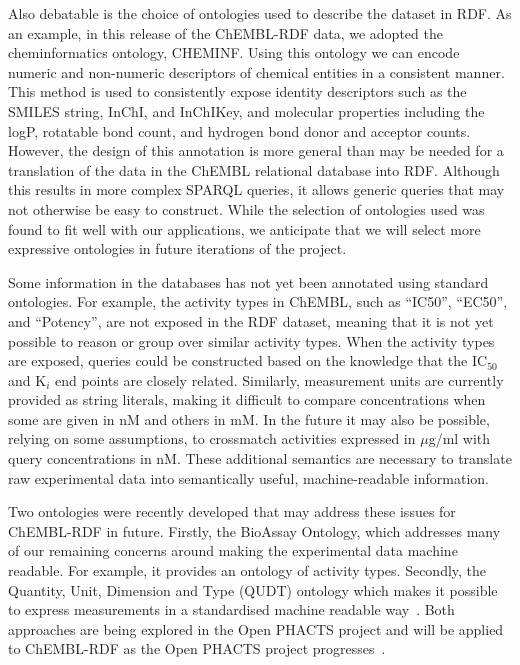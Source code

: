 \documentclass[10pt]{bmc_article}
\newenvironment{bmcformat}{\begin{raggedright}\baselineskip20pt\sloppy\setboolean{publ}{false}}{\end{raggedright}\baselineskip20pt\sloppy}
\begin{document}
\begin{bmcformat}
Also debatable is the choice of ontologies used to describe the dataset in RDF. As an example, in this release of the
ChEMBL-RDF data, we adopted the cheminformatics ontology, CHEMINF. Using this ontology
we can encode numeric and non-numeric descriptors of chemical entities in a consistent
manner. This method is used to consistently expose identity descriptors such
as the SMILES string, InChI, and InChIKey, and molecular properties including the
logP, rotatable bond count, and hydrogen bond donor and acceptor counts.
However, the design of this annotation is more general than may be needed for a translation
of the data in the ChEMBL relational database into RDF. Although this results in more 
complex SPARQL queries, it allows generic queries that may not otherwise be easy to construct.
While the selection of ontologies used was found to fit well with our applications,
we anticipate that we will select more expressive ontologies in future iterations of the project.

Some information in the databases has not yet been annotated using standard ontologies. 
For example, the activity types in ChEMBL, such as ``IC50'', ``EC50'', and ``Potency'', are not exposed in the RDF dataset,
meaning that it is not yet possible to reason or group over similar activity types.
When the activity types are exposed, queries could be constructed based on the knowledge 
that the IC$_{50}$ and K$_i$ end points are closely related. Similarly, measurement units are currently provided as
string literals, making it difficult to compare concentrations when some are given in nM and others in mM.
In the future it may also be possible, relying on some assumptions, to crossmatch activities
expressed in $\mu$g/ml with query concentrations in nM. These additional semantics are necessary 
to translate raw experimental data into semantically useful, machine-readable information.

Two ontologies were recently developed that may address these issues for ChEMBL-RDF in future.
Firstly, the BioAssay Ontology, which addresses many of our
remaining concerns around making the experimental data machine readable. For example,
it provides an ontology of activity types. Secondly,
the Quantity, Unit, Dimension and Type (QUDT) ontology which makes it possible
to express measurements in a standardised machine readable way~\cite{QUDT}. Both approaches are 
being explored in the Open PHACTS project and will be applied to ChEMBL-RDF as the Open PHACTS
project progresses~\cite{Williams2012}.


\end{bmcformat}
\end{document}
